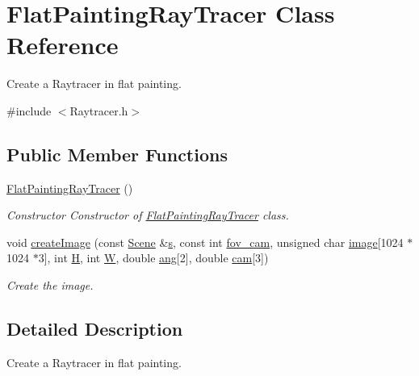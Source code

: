 \hypertarget{classFlatPaintingRayTracer}{}\section{Flat\+Painting\+Ray\+Tracer Class Reference}
\label{classFlatPaintingRayTracer}


Create a Raytracer in flat painting.  




{\ttfamily \#include $<$Raytracer.\+h$>$}

\subsection*{Public Member Functions}
\begin{DoxyCompactItemize}
\item 
\mbox{\label{classFlatPaintingRayTracer_aa75768f1962f246207bf43e7daaf825f}} 
\hyperlink{classFlatPaintingRayTracer_aa75768f1962f246207bf43e7daaf825f}{Flat\+Painting\+Ray\+Tracer} ()
\begin{DoxyCompactList}\small\item\em Constructor Constructor of \hyperlink{classFlatPaintingRayTracer}{Flat\+Painting\+Ray\+Tracer} class. \end{DoxyCompactList}\item 
void \hyperlink{classFlatPaintingRayTracer_a07aa98cec7650f0716a102d9f0fbe246}{create\+Image} (const \hyperlink{classScene}{Scene} \&\hyperlink{test_8cpp_aecc1396fc611f6e71d5d70228e7b089a}{s}, const int \hyperlink{test_8cpp_afac324b61ac0563c734fcdb81d98e344}{fov\+\_\+cam}, unsigned char \hyperlink{test_8cpp_a92ebae258b9cd4407b2510c3d18633ee}{image}\mbox{[}1024 $\ast$1024 $\ast$3\mbox{]}, int \hyperlink{test_8cpp_affa487e8e3cc48473cfc05c0ce0165e9}{H}, int \hyperlink{test_8cpp_a2dd51e03005d5cb52315290d27f61870}{W}, double \hyperlink{test_8cpp_a861ee06bf1e430650b4437260a119635}{ang}\mbox{[}2\mbox{]}, double \hyperlink{test_8cpp_a9fe883a18727d129289b149e5f0305eb}{cam}\mbox{[}3\mbox{]})
\begin{DoxyCompactList}\small\item\em Create the image. \end{DoxyCompactList}\end{DoxyCompactItemize}


\subsection{Detailed Description}
Create a Raytracer in flat painting. 

